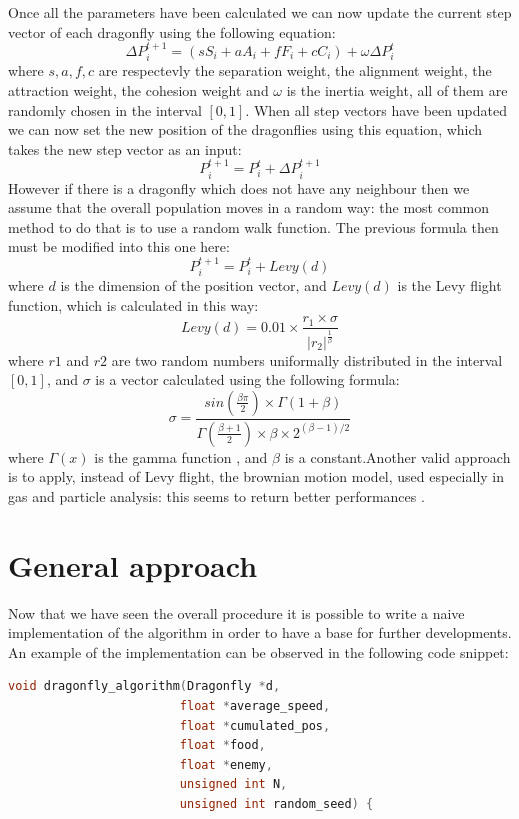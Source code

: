 \documentclass[10pt]{article}
\begin{document}
\begin{multicols}{2}
\noindent Once all the parameters have been calculated we can now update the current step vector of each dragonfly using the following equation: $$\Delta P^{t+1}_{i} = (sS_i + aA_i + fF_i + cC_i) + \omega\Delta P^t_i$$ where $s,a,f,c$ are respectevly the separation weight, the alignment weight, the attraction weight, the cohesion weight and $\omega$ is the inertia weight, all of them are randomly chosen in the interval $[0,1]$. When all step vectors have been updated we can now set the new position of the dragonflies using this equation, which takes the new step vector as an input: $$P^{t+1}_{i} = P_i^t + \Delta P_{i}^{t+1}$$However if there is a dragonfly which does not have any neighbour then we assume that the overall population moves in a random way: the most common method to do that is to use a random walk function. The previous formula then must be modified into this one here: $$P^{t+1}_i = P_i^t + Levy(d)$$ where $d$ is the dimension of the position vector, and $Levy(d)$ is the Levy flight function, which is calculated in this way: $$Levy(d) = 0.01\times\frac{r_1 \times \sigma}{|r_2|^{\frac{1}{\beta}}}$$ where $r1$ and $r2$ are two random numbers uniformally distributed in the interval $[0,1]$, and $\sigma$ is a vector calculated using the following formula: $$\sigma = \frac{sin(\frac{\beta\pi}{2})\times\Gamma(1+\beta)}{\Gamma(\frac{\beta+1}{2})\times \beta \times 2^{(\beta-1)/2}}$$ where $\Gamma(x)$ is the gamma function \cite{WikiGamma}, and $\beta$ is a constant.Another valid approach is to apply, instead of Levy flight, the brownian motion model, used especially in gas and particle analysis: this seems to return better performances \cite{BDragonfly}. 




\section{General approach}

Now that we have seen the overall procedure it is possible to write a naive implementation of the algorithm in order to 
have a base for further developments. An example of the implementation can be observed in the following code snippet:


\begin{lstlisting}[language=C,caption={first implementation of the dragonfly algorithm}]
void dragonfly_algorithm(Dragonfly *d, 
                        float *average_speed,
                        float *cumulated_pos, 
                        float *food, 
                        float *enemy,
                        unsigned int N, 
                        unsigned int random_seed) {


\end{lstlisting}
\end{multicols}
\end{document}
